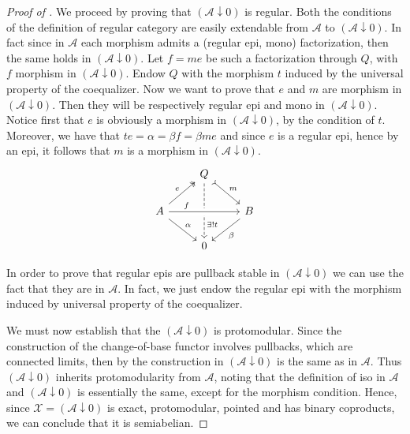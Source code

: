 \begin{subbox}{}
\begin{proof}[\textit{Proof of }]
    We proceed by proving that $(\mathcal{A} \downarrow 0)$ is regular. Both the conditions of the definition of regular category are easily extendable from $\mathcal{A}$ to $(\mathcal{A} \downarrow 0)$. In fact since in $\mathcal{A}$ each morphism admits a (regular epi, mono) factorization, then the same holds in $(\mathcal{A} \downarrow 0)$. Let $f=me$ be such a factorization through $Q$, with $f$ morphism in $(\mathcal{A} \downarrow 0)$. Endow $Q$ with the morphism $t$ induced by the universal property of the coequalizer. Now we want to prove that $e$ and $m$ are morphism in $(\mathcal{A} \downarrow 0)$. Then they will be respectively regular epi and mono in $(\mathcal{A} \downarrow 0)$. Notice first that $e$ is obviously a morphism in $(\mathcal{A} \downarrow 0)$, by the condition of $t$. Moreover, we have that $te=\alpha=\beta f= \beta me$ and since $e$ is a regular epi, hence by  an epi, it follows that $m$ is a morphism in $(\mathcal{A} \downarrow 0)$.
    \[
\begin{tikzcd}
    & Q \arrow[rd, "m", tail] \arrow[dd, "\exists ! t", pos=0.75, dashed] &                       \\
A \arrow[rr, "f", pos=0.25, crossing over] \arrow[ru, "e", two heads] \arrow[rd, "\alpha"] &                                                           & B \arrow[ld, "\beta"] \\
    & 0                                                         &                      
\end{tikzcd}
    \]

    In order to prove that regular epis are pullback stable in $(\mathcal{A} \downarrow 0)$ we can use the fact that they are in $\mathcal{A}$. In fact, we just endow the regular epi with the morphism induced by universal property of the coequalizer.

    We must now establish that the $(\mathcal{A} \downarrow 0)$ is protomodular. Since the construction of the change-of-base functor involves pullbacks, which are connected limits, then by  the construction in $(\mathcal{A} \downarrow 0)$ is the same as in $\mathcal{A}$. Thus $(\mathcal{A} \downarrow 0)$ inherits protomodularity from $\mathcal{A}$, noting that the definition of iso in $\mathcal{A}$ and $(\mathcal{A} \downarrow 0)$ is essentially the same, except for the morphism condition. Hence, since $\mathcal{X} = (\mathcal{A} \downarrow 0)$ is exact, protomodular, pointed and has binary coproducts, we can conclude that it is semiabelian.


\end{proof}
\end{subbox}
